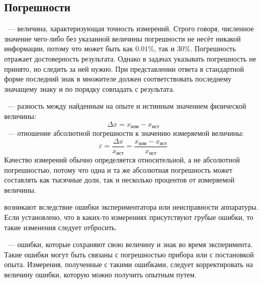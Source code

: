\subsection{Погрешности}
~--- величина, характеризующая точность измерений. Строго говоря, численное значение чего-либо без указанной величины погрешности не несёт никакой информации, потому что  может быть как $0.01\%$, так и $30\%$. Погрешность отражает достоверность результата. Однако в задачах указывать погрешность не принято, но следить за ней нужно. При представлении ответа в стандартной форме последний знак в множителе должен соответствовать последнему значащему знаку и по порядку совпадать с  результата.

~--- разность между найденным на опыте и истинным значением физической величины:
\begin{equation}
	\Delta x = x_\text{изм} - x_\text{ист}
\end{equation}
~--- отношение абсолютной погрешности к значению измеряемой величины:
\begin{equation}
	\varepsilon = \frac{\Delta x}{x_\text{ист}} = \frac{x_\text{изм} - x_\text{ист}}{x_\text{ист}}
\end{equation}
Качество измерений обычно определяется относительной, а не абсолютной погрешностью, потому что одна и та же абсолютная погрешность может составлять как тысячные доли, так и несколько процентов от измеряемой величины.

 возникают вследствие ошибки экспериментатора или неисправности аппаратуры. Если установлено, что в каких-то измерениях присутствуют грубые ошибки, то такие изменения следует отбросить.

~--- ошибки, которые сохраняют свою величину и знак во время эксперимента. Такие ошибки могут быть связаны с погрешностью прибора или с постановкой опыта. Измерения, полученные с такими ошибками, следует корректировать на величину ошибки, которую можно получить опытным путем.

